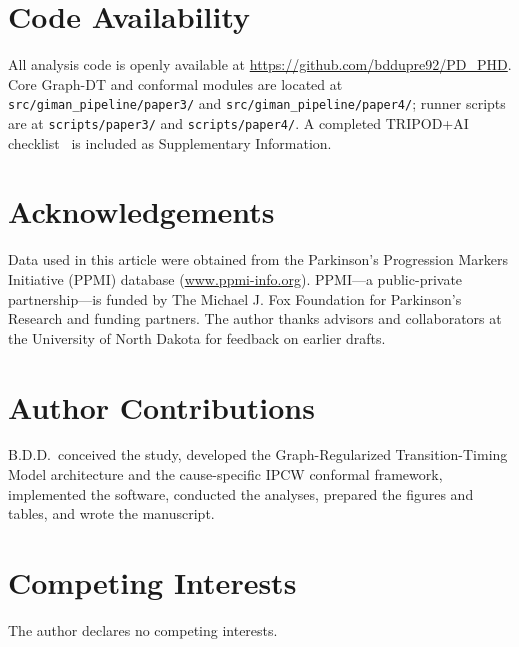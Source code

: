 \documentclass[11pt]{article}
\begin{document}
\section*{Code Availability}

All analysis code is openly available at \url{https://github.com/bddupre92/PD_PHD}. Core Graph-DT and conformal modules are located at \texttt{src/giman\_pipeline/paper3/} and \texttt{src/giman\_pipeline/paper4/}; runner scripts are at \texttt{scripts/paper3/} and \texttt{scripts/paper4/}. A completed TRIPOD+AI checklist~\cite{collins2024tripodai} is included as Supplementary Information.

\section*{Acknowledgements}

Data used in this article were obtained from the Parkinson's Progression Markers Initiative (PPMI) database (\url{www.ppmi-info.org}). PPMI---a public-private partnership---is funded by The Michael J. Fox Foundation for Parkinson's Research and funding partners. The author thanks advisors and collaborators at the University of North Dakota for feedback on earlier drafts.

\section*{Author Contributions}

B.D.D.\ conceived the study, developed the Graph-Regularized Transition-Timing Model architecture and the cause-specific IPCW conformal framework, implemented the software, conducted the analyses, prepared the figures and tables, and wrote the manuscript.

\section*{Competing Interests}

The author declares no competing interests.
\end{document}
